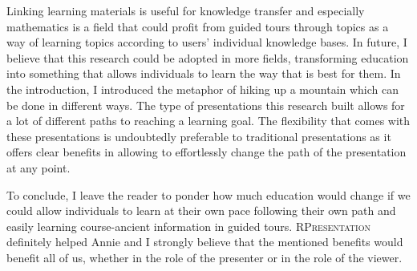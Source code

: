 \documentclass{llncs}
\newcommand{\sys}{\textsc{RPresentation}\xspace}
\begin{document}
Linking learning materials is useful for knowledge transfer and especially mathematics is a field that could profit from guided tours through topics as a way of learning topics according to users' individual knowledge bases. In future, I believe that this research could be adopted in more fields, transforming education into something that allows individuals to learn the way that is best for them. In the introduction, I introduced the metaphor of hiking up a mountain which can be done in different ways. The type of presentations this research built allows for a lot of different paths to reaching a learning goal. The flexibility that comes with these presentations is undoubtedly preferable to traditional presentations as it offers clear benefits in allowing to effortlessly change the path of the presentation at any point.

To conclude, I leave the reader to ponder how much education would change if we could allow individuals to learn at their own pace following their own path and easily learning course-ancient information in guided tours. \sys definitely helped Annie and I strongly believe that the mentioned benefits would benefit all of us, whether in the role of the presenter or in the role of the viewer.




\end{document}
